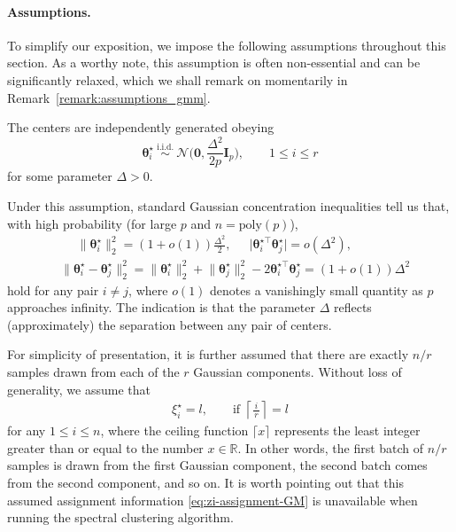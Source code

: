 \paragraph{Assumptions.} To simplify our exposition, we impose the following assumptions throughout this section. As a worthy note,  this assumption is often non-essential and can be significantly relaxed, which we shall remark on momentarily in Remark~\ref{remark:assumptions_gmm}.
%
\begin{assumption}
	\label{assumption:gaussian-mixture}
	The centers are independently generated obeying
	\[
		\bm{\theta}_{i}^{\star} ~\overset{\mathrm{i.i.d.}}{\sim}~ \mathcal{N}\Bigg( \bm{0}, \frac{\Delta^2}{2p} \bm{I}_p \Bigg),
		\qquad 1\leq i\leq r
	\]
	for some parameter $\Delta>0$.
\end{assumption}
%
Under this assumption, standard Gaussian concentration inequalities  \citep{vershynin2016high} tell us that, with high probability (for large $p$ and $n=\mathrm{poly}(p)$),
%
\begin{align*}
& ~~~~~~ \big\|\bm{\theta}_{i}^{\star}\big\|_{2}^{2}  =(1+o(1))\frac{\Delta^{2}}{2},
\quad~~
\big|\bm{\theta}_{i}^{\star\top}\bm{\theta}_{j}^{\star}\big|= o(\Delta^2), \\
& \big\|\bm{\theta}_{i}^{\star}-\bm{\theta}_{j}^{\star}\big\|_{2}^{2}
=\big\|\bm{\theta}_{i}^{\star}\big\|_{2}^{2}+\big\|\bm{\theta}_{j}^{\star}\big\|_{2}^{2}-2\bm{\theta}_{i}^{\star\top}\bm{\theta}_{j}^{\star}=(1+o(1))\Delta^{2}
\end{align*}
%
hold for any pair $i\neq j$, where $o(1)$ denotes a vanishingly small quantity as $p$ approaches infinity. The indication is that the parameter $\Delta$ reflects (approximately) the separation between any pair of centers.


For simplicity of presentation, it is further assumed that there are exactly $n/r$ samples drawn from each of the $r$ Gaussian components.
Without loss of generality, we assume that
%
\begin{align}
	\xi_{i}^{\star}=l,\qquad\text{if }\left\lceil \frac{\,i\,}{r}\right\rceil =l
	\label{eq:zi-assignment-GM}
\end{align}
%
for any $1\leq i\leq n$, where the ceiling function $\lceil x \rceil$ represents the least integer greater than or equal to the number $x\in \mathbb{R}$.
In other words, the first batch of $n/r$ samples is drawn from the first Gaussian component, the second batch comes from the second component, and so on.
It is worth pointing out that this assumed assignment information \eqref{eq:zi-assignment-GM} is unavailable when running the spectral clustering algorithm.




